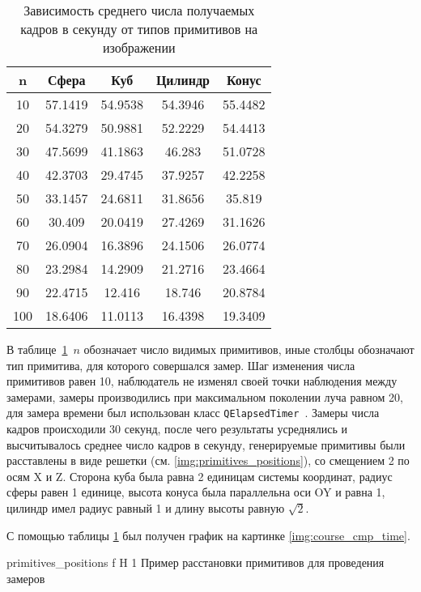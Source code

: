 \begin{table}[ht]
	\centering
	\caption{Зависимость среднего числа получаемых кадров в секунду от типов примитивов на изображении}
	\begin{tabular}{|c|c|c|c|c|}
		\hline
		n   & Сфера   & Куб     & Цилиндр & Конус   \\ \hline
		10  & 57.1419 & 54.9538 & 54.3946 & 55.4482 \\ \hline
		20  & 54.3279 & 50.9881 & 52.2229 & 54.4413 \\ \hline
		30  & 47.5699 & 41.1863 & 46.283  & 51.0728 \\ \hline
		40  & 42.3703 & 29.4745 & 37.9257 & 42.2258 \\ \hline
		50  & 33.1457 & 24.6811 & 31.8656 & 35.819  \\ \hline
		60  & 30.409  & 20.0419 & 27.4269 & 31.1626 \\ \hline
		70  & 26.0904 & 16.3896 & 24.1506 & 26.0774 \\ \hline
		80  & 23.2984 & 14.2909 & 21.2716 & 23.4664 \\ \hline
		90  & 22.4715 & 12.416  & 18.746  & 20.8784 \\ \hline
		100 & 18.6406 & 11.0113 & 16.4398 & 19.3409 \\ \hline
	\end{tabular}
	\label{t:timings}
\end{table}

В таблице~\ref{t:timings}~$n$ обозначает число видимых примитивов, иные столбцы обозначают тип примитива, для которого совершался замер. Шаг изменения числа примитивов равен 10, наблюдатель не изменял своей точки наблюдения между замерами, замеры производились при максимальном поколении луча равном 20, для замера времени был использован класс \texttt{QElapsedTimer}~\cite{QTimer}.
Замеры числа кадров  происходили 30 секунд, после чего результаты усреднялись и высчитывалось среднее число кадров в секунду, генерируемые примитивы были расставлены в виде решетки (см. \ref{img:primitives_positions}), со смещением 2 по осям X и Z. Сторона куба была равна 2 единицам системы координат, радиус сферы равен 1 единице, высота конуса была параллельна оси OY и равна 1, цилиндр имел радиус равный 1 и длину высоты равную $\sqrt{2}$.

С помощью таблицы \ref{t:timings} был получен график на картинке \ref{img:course_cmp_time}.


{primitives_positions} %
{f} %
{H} %
{1\textwidth} %
{Пример расстановки примитивов для проведения замеров} %



